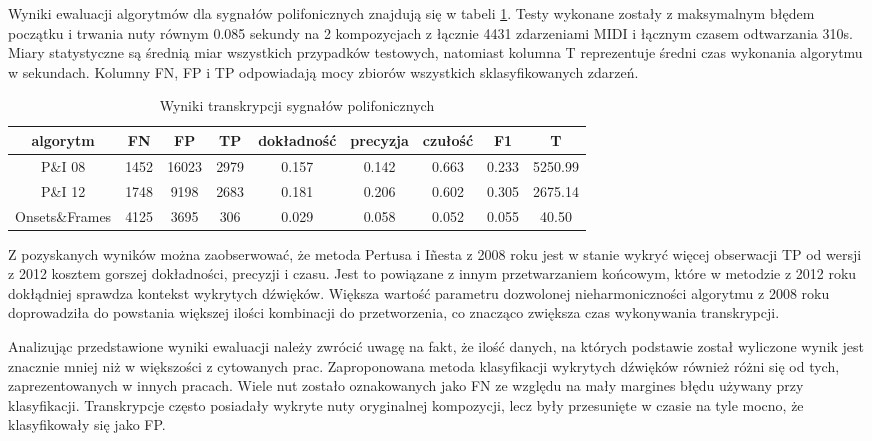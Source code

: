 \documentclass[12pt,a4paper,twoside]{mwart}
\begin{document}
Wyniki ewaluacji algorytmów dla sygnałów polifonicznych znajdują się w tabeli \ref{tab:eval:poli}. Testy wykonane zostały z maksymalnym błędem początku i trwania nuty równym 0.085 sekundy na 2 kompozycjach z łącznie 4431 zdarzeniami MIDI i łącznym czasem odtwarzania 310s. Miary statystyczne są średnią miar wszystkich przypadków testowych, natomiast kolumna T reprezentuje średni czas wykonania algorytmu w sekundach. Kolumny FN, FP i TP odpowiadają mocy zbiorów wszystkich sklasyfikowanych zdarzeń.

\begin{table}[H]
  \begin{center}
      \begin{tabular}{ |c|c|c|c|c|c|c|c|c| } 
      \hline
      algorytm & FN & FP & TP & dokładność & precyzja & czułość & F1 & T\\
      \hline
      P\&I 08 & 1452& 16023& 2979& 0.157 & 0.142 & 0.663 & 0.233 & 5250.99\\
      P\&I 12 & 1748& 9198& 2683& 0.181 & 0.206 & 0.602 & 0.305 & 2675.14\\
      Onsets\&Frames & 4125& 3695& 306& 0.029 & 0.058 & 0.052 & 0.055& 40.50 \\
      \hline
      \end{tabular}
  \end{center}
  \caption{Wyniki transkrypcji sygnałów polifonicznych}
  \label{tab:eval:poli}
\end{table}

Z pozyskanych wyników można zaobserwować, że metoda Pertusa i Iñesta z 2008 roku jest w stanie wykryć więcej obserwacji TP od wersji z 2012 kosztem gorszej dokładności, precyzji i czasu. Jest to powiązane z innym przetwarzaniem końcowym, które w metodzie z 2012 roku dokłądniej sprawdza kontekst wykrytych dźwięków. Większa wartość parametru dozwolonej nieharmoniczności algorytmu z 2008 roku doprowadziła do powstania większej ilości kombinacji do przetworzenia, co znacząco zwiększa czas wykonywania transkrypcji.

Analizując przedstawione wyniki ewaluacji należy zwrócić uwagę na fakt, że ilość danych, na których podstawie został wyliczone wynik jest znacznie mniej niż w większości z cytowanych prac. Zaproponowana metoda klasyfikacji wykrytych dźwięków również różni się od tych, zaprezentowanych w innych pracach. Wiele nut zostało oznakowanych jako FN ze względu na mały margines błędu używany przy klasyfikacji. Transkrypcje często posiadały wykryte nuty oryginalnej kompozycji, lecz były przesunięte w czasie na tyle mocno, że klasyfikowały się jako FP.
\end{document}

